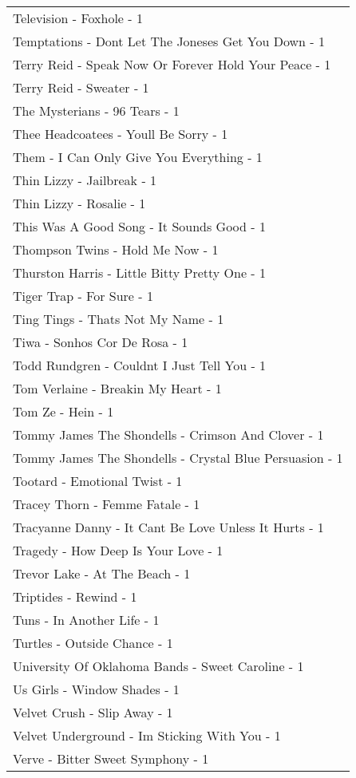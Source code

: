 \documentclass[
]{article}
\begin{document}
\begin{longtable}{l}
Television - Foxhole - 1 \\ 
Temptations - Dont Let The Joneses Get You Down - 1 \\ 
Terry Reid - Speak Now Or Forever Hold Your Peace - 1 \\ 
Terry Reid - Sweater - 1 \\ 
The Mysterians - 96 Tears - 1 \\ 
Thee Headcoatees - Youll Be Sorry - 1 \\ 
Them - I Can Only Give You Everything - 1 \\ 
Thin Lizzy - Jailbreak - 1 \\ 
Thin Lizzy - Rosalie - 1 \\ 
This Was A Good Song - It Sounds Good - 1 \\ 
Thompson Twins - Hold Me Now - 1 \\ 
Thurston Harris - Little Bitty Pretty One - 1 \\ 
Tiger Trap - For Sure - 1 \\ 
Ting Tings - Thats Not My Name - 1 \\ 
Tiwa - Sonhos Cor De Rosa - 1 \\ 
Todd Rundgren - Couldnt I Just Tell You - 1 \\ 
Tom Verlaine - Breakin My Heart - 1 \\ 
Tom Ze - Hein - 1 \\ 
Tommy James The Shondells - Crimson And Clover - 1 \\ 
Tommy James The Shondells - Crystal Blue Persuasion - 1 \\ 
Tootard - Emotional Twist - 1 \\ 
Tracey Thorn - Femme Fatale - 1 \\ 
Tracyanne Danny - It Cant Be Love Unless It Hurts - 1 \\ 
Tragedy - How Deep Is Your Love - 1 \\ 
Trevor Lake - At The Beach - 1 \\ 
Triptides - Rewind - 1 \\ 
Tuns - In Another Life - 1 \\ 
Turtles - Outside Chance - 1 \\ 
University Of Oklahoma Bands - Sweet Caroline - 1 \\ 
Us Girls - Window Shades - 1 \\ 
Velvet Crush - Slip Away - 1 \\ 
Velvet Underground - Im Sticking With You - 1 \\ 
Verve - Bitter Sweet Symphony - 1 \\ 

\end{longtable}
\end{document}
